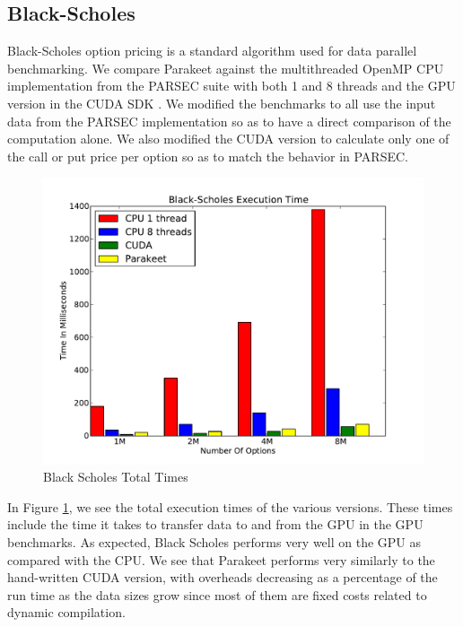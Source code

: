 \documentclass[10pt,twocolumn]{article}
\begin{document}
\subsection{Black-Scholes}
\label{results-bs}

Black-Scholes option pricing \cite{Blac73} is a standard algorithm used for data parallel benchmarking.  We compare Parakeet against the multithreaded OpenMP CPU implementation from the PARSEC \cite{Bien08} suite with both 1 and 8 threads and the GPU version in the CUDA SDK \cite{NvidSD}.  We modified the benchmarks to all use the input data from the PARSEC implementation so as to have a direct comparison of the computation alone.  We also modified the CUDA version to calculate only one of the call or put price per option so as to match the behavior in PARSEC.

\begin{figure}[h!]
\includegraphics[scale=0.4]{BSWCPU.pdf}
\caption{Black Scholes Total Times}
\label{BSCPU}
\end{figure}

In Figure \ref{BSCPU}, we see the total execution times of the various versions. These times include the time it takes to transfer data to and from the GPU in the GPU benchmarks.  As expected, Black Scholes performs very well on the GPU as compared with the CPU.  We see that Parakeet performs very similarly to the hand-written CUDA version, with overheads decreasing as a percentage of the run time as the data sizes grow since most of them are fixed costs related to dynamic compilation.
\end{document}
